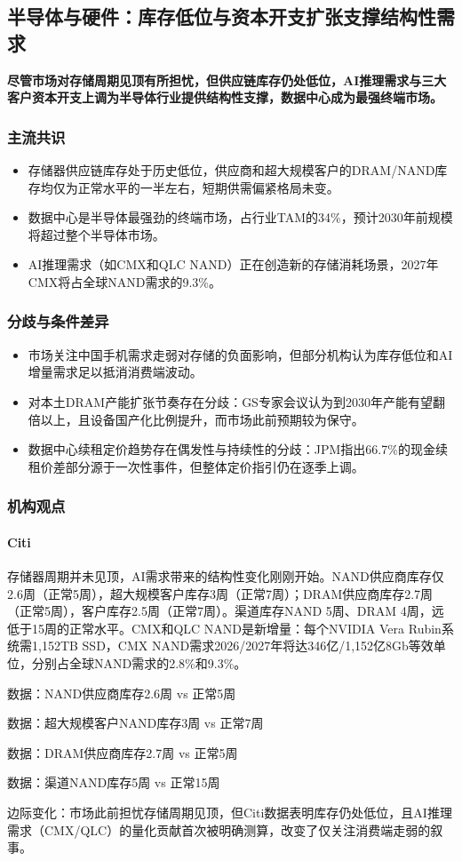 \documentclass[11pt]{ctexart}
\begin{document}
\subsection{半导体与硬件：库存低位与资本开支扩张支撑结构性需求}
\textbf{尽管市场对存储周期见顶有所担忧，但供应链库存仍处低位，AI推理需求与三大客户资本开支上调为半导体行业提供结构性支撑，数据中心成为最强终端市场。}
\subsubsection*{主流共识}
\begin{itemize}
  \item 存储器供应链库存处于历史低位，供应商和超大规模客户的DRAM/NAND库存均仅为正常水平的一半左右，短期供需偏紧格局未变。
  \item 数据中心是半导体最强劲的终端市场，占行业TAM的34\%，预计2030年前规模将超过整个半导体市场。
  \item AI推理需求（如CMX和QLC NAND）正在创造新的存储消耗场景，2027年CMX将占全球NAND需求的9.3\%。
\end{itemize}
\subsubsection*{分歧与条件差异}
\begin{itemize}
  \item 市场关注中国手机需求走弱对存储的负面影响，但部分机构认为库存低位和AI增量需求足以抵消消费端波动。
  \item 对本土DRAM产能扩张节奏存在分歧：GS专家会议认为到2030年产能有望翻倍以上，且设备国产化比例提升，而市场此前预期较为保守。
  \item 数据中心续租定价趋势存在偶发性与持续性的分歧：JPM指出66.7\%的现金续租价差部分源于一次性事件，但整体定价指引仍在逐季上调。
\end{itemize}
\subsubsection*{机构观点}
\paragraph{Citi} 存储器周期并未见顶，AI需求带来的结构性变化刚刚开始。NAND供应商库存仅2.6周（正常5周），超大规模客户库存3周（正常7周）；DRAM供应商库存2.7周（正常5周），客户库存2.5周（正常7周）。渠道库存NAND 5周、DRAM 4周，远低于15周的正常水平。CMX和QLC NAND是新增量：每个NVIDIA Vera Rubin系统需1,152TB SSD，CMX NAND需求2026/2027年将达346亿/1,152亿8Gb等效单位，分别占全球NAND需求的2.8\%和9.3\%。
{\small\color{refgray}数据：NAND供应商库存2.6周 vs 正常5周\par}
{\small\color{refgray}数据：超大规模客户NAND库存3周 vs 正常7周\par}
{\small\color{refgray}数据：DRAM供应商库存2.7周 vs 正常5周\par}
{\small\color{refgray}数据：渠道NAND库存5周 vs 正常15周\par}
{\small\color{refgray}边际变化：市场此前担忧存储周期见顶，但Citi数据表明库存仍处低位，且AI推理需求（CMX/QLC）的量化贡献首次被明确测算，改变了仅关注消费端走弱的叙事。\par}
\end{document}
